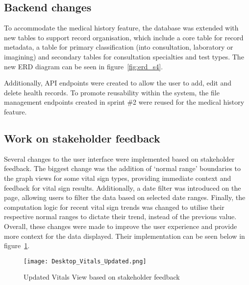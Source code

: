 \subsection{Backend changes}

To accommodate the medical history feature, the database was extended with new tables to support record organisation, which include a core table for record metadata, a table for primary classification (into consultation, laboratory or imagining) and secondary tables for consultation specialties and test types. The new ERD diagram can be seen in figure~\ref{fig:erd_s4}.

Additionally, API endpoints were created to allow the user to add, edit and delete health records. To promote reusability within the system, the file management endpoints created in sprint \#2 were reused for the medical history feature. 

\noindent\begin{minipage}{\textwidth}
  \begin{center}
      \label{fig:erd_s4}
  \end{center}
\end{minipage}

\subsection{Work on stakeholder feedback}

Several changes to the user interface were implemented based on stakeholder feedback. The biggest change was the addition of `normal range' boundaries to the graph views for some vital sign types, providing immediate context and feedback for vital sign results. Additionally, a date filter was introduced on the page, allowing users to filter the data based on selected date ranges. Finally, the computation logic for recent vital sign trends was changed to utilise their respective normal ranges to dictate their trend, instead of the previous value. Overall, these changes were made to improve the user experience and provide more context for the data displayed. Their implementation can be seen below in figure~\ref{fig:vitalchanges}.

\begin{figure}[htbp]
  \centering
  \texttt{[image: Desktop\_Vitals\_Updated.png]}
  \caption{Updated Vitals View based on stakeholder feedback}\label{fig:vitalchanges}
\end{figure}


